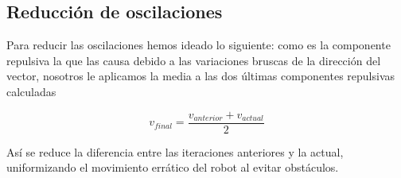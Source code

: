 \documentclass[a4paper, 11pt, titlepage]{article}
\begin{document}
  \subsection{Reducción de oscilaciones}
    Para reducir las oscilaciones hemos ideado lo siguiente: como es la componente repulsiva la que las causa debido a las variaciones bruscas de la dirección del vector, nosotros le aplicamos la media a las dos últimas componentes repulsivas calculadas

    $$ v_{final} = \frac{v_{anterior} + v_{actual}}{2}$$


    Así se reduce la diferencia entre las iteraciones anteriores y la actual, uniformizando el movimiento errático del robot al evitar obstáculos.
\end{document}
